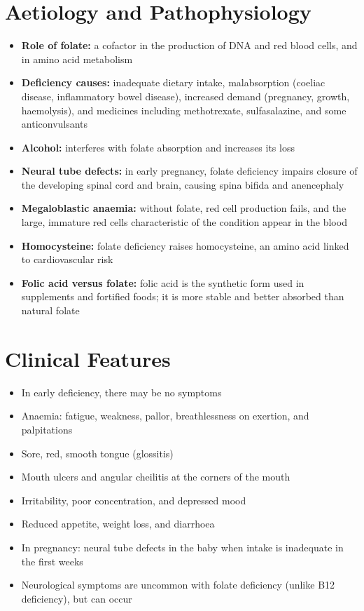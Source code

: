 \section*{Aetiology and Pathophysiology}
\begin{itemize}
    \item \textbf{Role of folate:} a cofactor in the production of DNA and red blood cells, and in amino acid metabolism
    \item \textbf{Deficiency causes:} inadequate dietary intake, malabsorption (coeliac disease, inflammatory bowel disease), increased demand (pregnancy, growth, haemolysis), and medicines including methotrexate, sulfasalazine, and some anticonvulsants
    \item \textbf{Alcohol:} interferes with folate absorption and increases its loss
    \item \textbf{Neural tube defects:} in early pregnancy, folate deficiency impairs closure of the developing spinal cord and brain, causing spina bifida and anencephaly
    \item \textbf{Megaloblastic anaemia:} without folate, red cell production fails, and the large, immature red cells characteristic of the condition appear in the blood
    \item \textbf{Homocysteine:} folate deficiency raises homocysteine, an amino acid linked to cardiovascular risk
    \item \textbf{Folic acid versus folate:} folic acid is the synthetic form used in supplements and fortified foods; it is more stable and better absorbed than natural folate
\end{itemize}

\section*{Clinical Features}
\begin{itemize}
    \item In early deficiency, there may be no symptoms
    \item Anaemia: fatigue, weakness, pallor, breathlessness on exertion, and palpitations
    \item Sore, red, smooth tongue (glossitis)
    \item Mouth ulcers and angular cheilitis at the corners of the mouth
    \item Irritability, poor concentration, and depressed mood
    \item Reduced appetite, weight loss, and diarrhoea
    \item In pregnancy: neural tube defects in the baby when intake is inadequate in the first weeks
    \item Neurological symptoms are uncommon with folate deficiency (unlike B12 deficiency), but can occur
\end{itemize}

